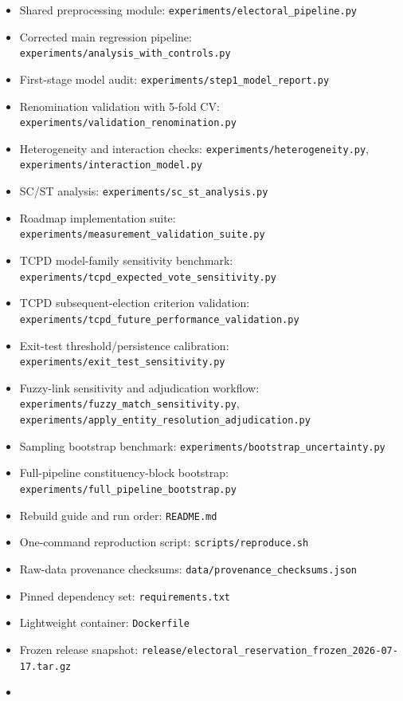 \documentclass[
]{article}
\providecommand{\tightlist}{%
  \setlength{\itemsep}{0pt}\setlength{\parskip}{0pt}}
\begin{document}
\begin{itemize}
\tightlist
\item
  Shared preprocessing module: \texttt{experiments/electoral\_pipeline.py}
\item
  Corrected main regression pipeline: \texttt{experiments/analysis\_with\_controls.py}
\item
  First-stage model audit: \texttt{experiments/step1\_model\_report.py}
\item
  Renomination validation with 5-fold CV: \texttt{experiments/validation\_renomination.py}
\item
  Heterogeneity and interaction checks: \texttt{experiments/heterogeneity.py}, \texttt{experiments/interaction\_model.py}
\item
  SC/ST analysis: \texttt{experiments/sc\_st\_analysis.py}
\item
  Roadmap implementation suite: \texttt{experiments/measurement\_validation\_suite.py}
\item
  TCPD model-family sensitivity benchmark: \texttt{experiments/tcpd\_expected\_vote\_sensitivity.py}
\item
  TCPD subsequent-election criterion validation: \texttt{experiments/tcpd\_future\_performance\_validation.py}
\item
  Exit-test threshold/persistence calibration: \texttt{experiments/exit\_test\_sensitivity.py}
\item
  Fuzzy-link sensitivity and adjudication workflow: \texttt{experiments/fuzzy\_match\_sensitivity.py}, \texttt{experiments/apply\_entity\_resolution\_adjudication.py}
\item
  Sampling bootstrap benchmark: \texttt{experiments/bootstrap\_uncertainty.py}
\item
  Full-pipeline constituency-block bootstrap: \texttt{experiments/full\_pipeline\_bootstrap.py}
\item
  Rebuild guide and run order: \texttt{README.md}
\item
  One-command reproduction script: \texttt{scripts/reproduce.sh}
\item
  Raw-data provenance checksums: \texttt{data/provenance\_checksums.json}
\item
  Pinned dependency set: \texttt{requirements.txt}
\item
  Lightweight container: \texttt{Dockerfile}
\item
  Frozen release snapshot: \texttt{release/electoral\_reservation\_frozen\_2026-07-17.tar.gz}
\item

\end{itemize}
\end{document}

